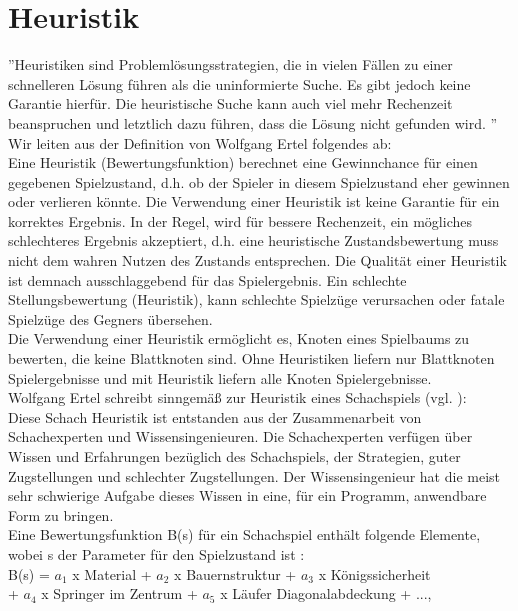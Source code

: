 \section{Heuristik}
\label{sec:Heuristik}
''Heuristiken sind Problemlösungsstrategien, die in vielen Fällen zu einer schnelleren Lösung führen als die uninformierte Suche. Es gibt jedoch keine Garantie hierfür. Die heuristische Suche kann auch viel mehr Rechenzeit beanspruchen und letztlich dazu führen, dass die Lösung nicht gefunden wird. \cite[105]{Ertel}''\\

Wir leiten aus der Definition von Wolfgang Ertel folgendes ab:\\ 
Eine Heuristik (Bewertungsfunktion) berechnet eine Gewinnchance für einen gegebenen Spielzustand, d.h. ob der Spieler in diesem Spielzustand eher gewinnen oder verlieren könnte. Die Verwendung einer Heuristik ist keine Garantie für ein korrektes Ergebnis. In der Regel, wird für bessere Rechenzeit, ein mögliches schlechteres Ergebnis akzeptiert, d.h. eine heuristische Zustandsbewertung muss nicht dem wahren Nutzen des Zustands entsprechen. Die Qualität einer Heuristik ist demnach ausschlaggebend für das Spielergebnis. Ein schlechte Stellungsbewertung (Heuristik), kann schlechte Spielzüge verursachen oder fatale Spielzüge des Gegners übersehen. \\

Die Verwendung einer Heuristik ermöglicht es, Knoten eines Spielbaums zu bewerten, die keine Blattknoten sind. Ohne Heuristiken liefern nur Blattknoten Spielergebnisse und mit Heuristik liefern alle Knoten Spielergebnisse. \\

Wolfgang Ertel schreibt sinngemäß zur Heuristik eines Schachspiels (vgl. \cite[118]{Ertel}): \\
Diese Schach Heuristik ist entstanden aus der Zusammenarbeit von Schachexperten und Wissensingenieuren. Die Schachexperten verfügen über Wissen und Erfahrungen bezüglich des Schachspiels, der Strategien, guter Zugstellungen und schlechter Zugstellungen. Der Wissensingenieur hat die meist sehr schwierige Aufgabe dieses Wissen in eine, für ein Programm, anwendbare Form zu bringen. \\

Eine Bewertungsfunktion B(s) für ein Schachspiel enthält folgende Elemente, wobei s der Parameter für den Spielzustand ist \cite[119]{Ertel}: \\

B(s) = $a_1$ x Material +  $a_2$ x Bauernstruktur + $a_3$ x Königssicherheit \\
\tab \tab + $a_4$ x Springer im Zentrum + $a_5$ x Läufer Diagonalabdeckung + ..., \\ 

